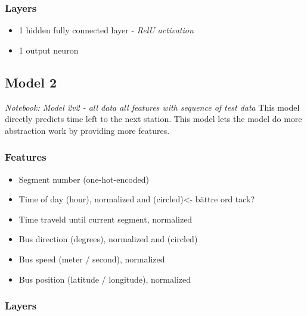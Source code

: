 \subsubsection{Layers}

\begin{itemize}
    \item 1 hidden fully connected layer - \textit{RelU activation}
    \item 1 output neuron
\end{itemize}


\subsection{Model 2}\label{M2}
\textit{Notebook: Model 2v2 - all data all features with sequence of test data}
\noindent This model directly predicts time left to the next station. This model lets the model do more abstraction work by providing more features. 

\subsubsection{Features}

\begin{itemize}
    \item Segment number (one-hot-encoded)
    \item Time of day (hour), normalized and (circled)<- bättre ord tack?
    \item Time traveld until current segment, normalized
    \item Bus direction (degrees), normalized and (circled)
    \item Bus speed (meter / second), normalized
    \item Bus position (latitude / longitude), normalized
\end{itemize}
  

\subsubsection{Layers}

